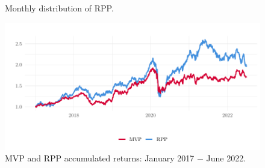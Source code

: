 \begin{figure}[H]
	\begin{subfigmatrix}{2}
	\end{subfigmatrix}
	\caption{Monthly distribution of RPP.}
	\label{fig:totalRiskPPP}
\end{figure}



\begin{figure}[H]
	\centering
	\includegraphics[width=0.7\linewidth]{figures/retornovolHighLow.pdf}
	\caption{MVP and RPP accumulated returns: January 2017 $-$ June 2022.}
	\label{fig:retornoRPPMVP}
\end{figure}


